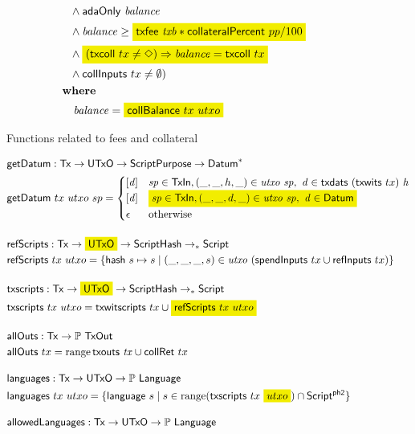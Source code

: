 \begin{figure*}[htb]
\begin{align*}
    &~~~~~~\wedge \fun{adaOnly}~\var{balance} \\
    &~~~~~~\wedge \var{balance} \geq \hldiff{\txfee{txb} * \fun{collateralPercent}~pp / 100} \\
    &~~~~~~\wedge \hldiff{(\fun{txcoll}~tx \neq \Nothing) \Rightarrow \var{balance} = \fun{txcoll}~tx} \\
    &~~~~~~\wedge \fun{collInputs}~{tx} \neq \emptyset) \\
    &~~      \where \\
    & ~~~~~~~ \var{balance}=\hldiff{\fun{collBalance}~tx~utxo}
  \end{align*}
  \caption{Functions related to fees and collateral}
  \label{fig:functions:utxo}
\end{figure*}

\begin{figure*}
  \begin{align*}
    & \fun{getDatum} : \Tx \to \UTxO \to \ScriptPurpose \to \seqof{\Datum} \\
    & \fun{getDatum}~{tx}~{utxo}~{sp} =
      \begin{cases}
        [\var{d}] & \var{sp} \in \TxIn, (\_, \_, h, \_) \in \var{utxo}~\var{sp},~ \var{d}\in\fun{txdats}~(\fun{txwits}~tx)~\var{h} \\
        [\var{d}] & \hldiff{\var{sp} \in \TxIn, (\_, \_, d, \_) \in \var{utxo}~\var{sp},~ \var{d} \in \Datum} \\
        \epsilon  & \text{otherwise}
      \end{cases}
    \nextdef
    & \fun{refScripts} : \Tx \to \hldiff{\UTxO} \to \ScriptHash \pto \Script \\
    & \fun{refScripts}~tx~utxo = \{ \fun{hash}~s \mapsto s \mid (\_, \_, \_, s) \in \var{utxo}~(\fun{spendInputs}~tx \cup \fun{refInputs}~tx)\}
    \nextdef
    & \fun{txscripts} : \Tx \to \hldiff{\UTxO} \to \ScriptHash \pto \Script \\
    & \fun{txscripts}~tx~utxo = \fun{txwitscripts}~tx \cup \hldiff{\fun{refScripts}~tx~utxo}
    \nextdef
    & \fun{allOuts} : \Tx \to \powerset{\TxOut} \\
    & \fun{allOuts}~tx = \range \txouts{tx} \cup \fun{collRet}~tx
    \nextdef
    & \fun{languages} : \Tx \to \UTxO \to \powerset{\Language} \\
    & \fun{languages}~tx~utxo =
      \{\fun{language}~s \mid s \in \range (\fun{txscripts}~tx~\hldiff{utxo}) \cap \ScriptPhTwo\}
    \nextdef
    & \fun{allowedLanguages} : \Tx \to \UTxO \to \powerset{\Language} \\

\end{align*}
\end{figure*}

